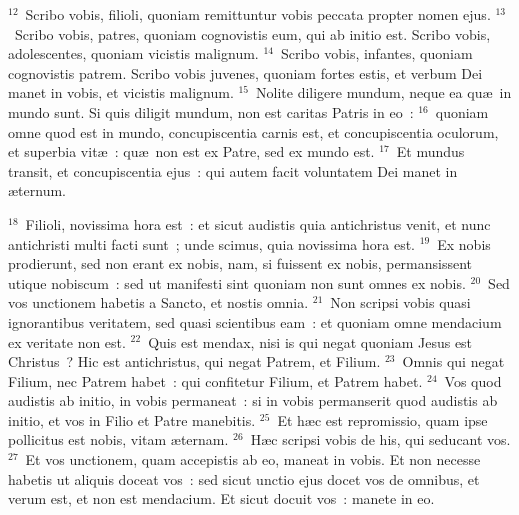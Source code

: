 ${}^{12}$~Scribo vobis, filioli, quoniam remittuntur vobis peccata propter nomen ejus.
${}^{13}$~Scribo vobis, patres, quoniam cognovistis eum, qui ab initio est. Scribo vobis, adolescentes, quoniam vicistis malignum.
${}^{14}$~Scribo vobis, infantes, quoniam cognovistis patrem. Scribo vobis juvenes, quoniam fortes estis, et verbum Dei manet in vobis, et vicistis malignum.
${}^{15}$~Nolite diligere mundum, neque ea qu\ae\ in mundo sunt. Si quis diligit mundum, non est caritas Patris in eo~:
${}^{16}$~quoniam omne quod est in mundo, concupiscentia carnis est, et concupiscentia oculorum, et superbia vit\ae~: qu\ae\ non est ex Patre, sed ex mundo est.
${}^{17}$~Et mundus transit, et concupiscentia ejus~: qui autem facit voluntatem Dei manet in \ae ternum.


${}^{18}$~Filioli, novissima hora est~: et sicut audistis quia antichristus venit, et nunc antichristi multi facti sunt~; unde scimus, quia novissima hora est.
${}^{19}$~Ex nobis prodierunt, sed non erant ex nobis, nam, si fuissent ex nobis, permansissent utique nobiscum~: sed ut manifesti sint quoniam non sunt omnes ex nobis.
${}^{20}$~Sed vos unctionem habetis a Sancto, et nostis omnia.
${}^{21}$~Non scripsi vobis quasi ignorantibus veritatem, sed quasi scientibus eam~: et quoniam omne mendacium ex veritate non est.
${}^{22}$~Quis est mendax, nisi is qui negat quoniam Jesus est Christus~? Hic est antichristus, qui negat Patrem, et Filium.
${}^{23}$~Omnis qui negat Filium, nec Patrem habet~: qui confitetur Filium, et Patrem habet.
${}^{24}$~Vos quod audistis ab initio, in vobis permaneat~: si in vobis permanserit quod audistis ab initio, et vos in Filio et Patre manebitis.
${}^{25}$~Et h\ae c est repromissio, quam ipse pollicitus est nobis, vitam \ae ternam.
${}^{26}$~H\ae c scripsi vobis de his, qui seducant vos.
${}^{27}$~Et vos unctionem, quam accepistis ab eo, maneat in vobis. Et non necesse habetis ut aliquis doceat vos~: sed sicut unctio ejus docet vos de omnibus, et verum est, et non est mendacium. Et sicut docuit vos~: manete in eo.


